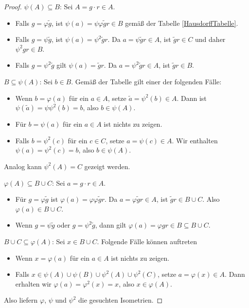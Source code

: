 \documentclass[german]{article}
\theoremstyle{break}
\theoremstyle{def_style}
\theoremstyle{def_style}
\theoremstyle{lemma_style}
\begin{document}
\begin{proof}
	$\psi(A)\subseteq B$: Sei $A=g\cdot r \in A$.
	\begin{itemize}
		\item Falls $g=\varphi\tilde{g}$, ist $\psi(a)=\psi\varphi\tilde{g}r\in B$ gemäß der Tabelle \ref{HausdorffTabelle}.
		\item Falls $g=\psi\tilde{g}$, ist $\psi(a)=\psi^2\tilde{g}r$. Da $a=\psi\tilde{g}r\in A$, ist $\tilde{g}r\in C$ und daher $\psi^2gr\in B$.
		\item Falls $g=\psi^2\tilde{g}$ gilt $\psi(a)=\tilde{g}r$. Da $a=\psi^2\tilde{g}r\in A$, ist $\tilde{g}r\in B$.
	\end{itemize}
	\par
	
	$B\subseteq\psi(A)$: Sei $b\in B$. Gemäß der Tabelle gilt einer der folgenden Fälle:
	\begin{itemize}
		\item Wenn $b=\varphi(a)$ für ein $a\in A$, setze $\tilde{a}=\psi^2(b)\in A$. Dann ist $\psi(\tilde{a})=\psi\psi^2(b)=b$, also $b\in\psi(A)$.
		\item Für $b=\psi(a)$ für ein $a\in A$ ist nichts zu zeigen.
		\item Falls $b=\psi^2(c)$ für ein $c\in C$, setze $a=\psi(c)\in A$. Wir enthalten $\psi(a)=\psi^2(c)=b$, also $b\in\psi(A)$.
	\end{itemize}
	\par

	Analog kann $\psi^2(A)=C$ gezeigt werden.
	\par
	
	$\varphi(A)\subseteq B\cup C$: Sei $a=g\cdot r\in A$.
	\begin{itemize}
		\item Für $g=\varphi\tilde{g}$ ist $\varphi(a)=\varphi\varphi\tilde{g}r$. Da $a=\varphi\tilde{g}r\in A$, ist $\tilde{g}r\in B\cup C$. Also $\varphi(a)\in B\cup C$.
		\item Wenn $g=\psi\tilde{g}$ oder $g=\psi^2\tilde{g}$, dann gilt $\varphi(a)=\varphi gr\in B\subseteq B\cup C$.
	\end{itemize}
	\par

	$B\cup C\subseteq\varphi(A)$: Sei $x\in B\cup C$. Folgende Fälle können auftreten
	\begin{itemize}
		\item Wenn $x=\varphi(a)$ für ein $a\in A$ ist nichts zu zeigen.
		\item Falls $x\in\psi(A)\cup\psi(B)\cup\psi^2(A)\cup\psi^2(C)$, setze $a=\varphi(x)\in A$. Dann erhalten wir $\varphi(a)=\varphi^2(x)=x$, also $x\in \varphi(A)$.
	\end{itemize}

	Also liefern $\varphi$, $\psi$ und $\psi^2$ die gesuchten Isometrien.
\end{proof}
\end{document}
